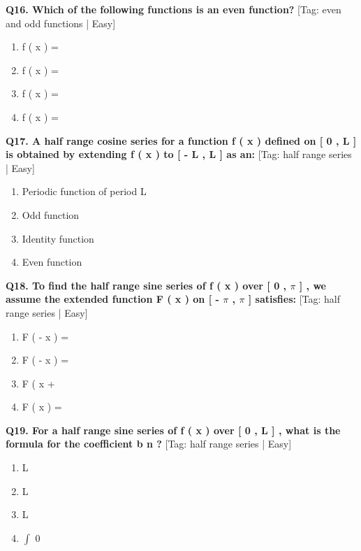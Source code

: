 \noindent\textbf{Q16. Which of the following functions is an even function?} \hfill [Tag: even and odd functions | Easy]
\begin{enumerate}[label=(\alph*),topsep=2pt,itemsep=1pt,partopsep=0pt,parsep=0pt]
    \item {{f ( x ) =}}
    \item {{f ( x ) =}}
    \item {{f ( x ) =}}
    \item {{f ( x ) =}}
\end{enumerate}
\vspace{2mm}

\noindent\textbf{Q17. A half range cosine series for a function f ( x ) defined on [ 0 , L ] is obtained by extending f ( x ) to [ - L , L ] as an:} \hfill [Tag: half range series | Easy]
\begin{enumerate}[label=(\alph*),topsep=2pt,itemsep=1pt,partopsep=0pt,parsep=0pt]
    \item {{Periodic function of period L}}
    \item {{Odd function}}
    \item {{Identity function}}
    \item {{Even function}}
\end{enumerate}
\vspace{2mm}

\noindent\textbf{Q18. To find the half range sine series of f ( x ) over [ 0 , $\pi$ ] , we assume the extended function F ( x ) on [ - $\pi$ , $\pi$ ] satisfies:} \hfill [Tag: half range series | Easy]
\begin{enumerate}[label=(\alph*),topsep=2pt,itemsep=1pt,partopsep=0pt,parsep=0pt]
    \item {{F ( - x ) =}}
    \item {{F ( - x ) =}}
    \item {{F ( x +}}
    \item {{F ( x ) =}}
\end{enumerate}
\vspace{2mm}

\noindent\textbf{Q19. For a half range sine series of f ( x ) over [ 0 , L ] , what is the formula for the coefficient b n ?} \hfill [Tag: half range series | Easy]
\begin{enumerate}[label=(\alph*),topsep=2pt,itemsep=1pt,partopsep=0pt,parsep=0pt]
    \item {{L}}
    \item {{L}}
    \item {{L}}
    \item {{$\int$ 0}}
\end{enumerate}
\vspace{2mm}

